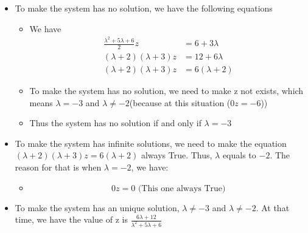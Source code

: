 \documentclass{article}
\begin{document}
        \begin{itemize}
            \item To make the system has no solution, we have the following equations
            \begin{itemize}
                \item We have
                \begin{align}
                    \frac{\lambda^2 + 5 \lambda + 6}{2}z &= 6 + 3 \lambda \\
                    (\lambda + 2)(\lambda + 3)z &= 12 + 6\lambda \\
                    (\lambda + 2)(\lambda + 3)z &= 6(\lambda + 2)
                \end{align}
                \item To make the system has no solution, we need to make z not exists, which means \(\lambda = -3\) and \(\lambda \neq -2\)(because at this situation (\(0z = -6\)))
                \item Thus the system has no solution if and only if \(\lambda = -3\)
            \end{itemize}
            \item To make the system has infinite solutions, we need to make the equation \((\lambda + 2)(\lambda + 3)z = 6(\lambda + 2)\) always True. Thus, \(\lambda\) equals to \(-2\). The reason for that is when \(\lambda = -2\), we have:
            \begin{itemize}
                \item \begin{equation}
                    0z = 0 \text{    (This one always True)}
                \end{equation}
            \end{itemize}
            \item To make the system has an unique solution, \(\lambda \neq -3\) and \(\lambda \neq -2\). At that time, we have the value of z is \(\frac{6\lambda + 12}{\lambda^{2} + 5 \lambda + 6}\)
        \end{itemize}
        
            
        \newpage
\end{document}
